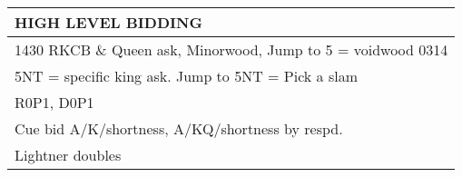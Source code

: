 \documentclass{article}
\begin{document}
\noindent
\begin{tabular}{| p{284mm} |}
	\hline
	\cellcolor{green!25} \textbf{HIGH LEVEL BIDDING}  \\ \hline
	1430 RKCB \& Queen ask, Minorwood, Jump to 5 = voidwood 0314\\ \hline
	5NT = specific king ask. Jump to 5NT = Pick a slam\\ \hline
	R0P1, D0P1 \\ \hline
	Cue bid A/K/shortness, A/KQ/shortness by respd. \\ \hline
	Lightner doubles  \\ \hline

\end{tabular}
\end{document}
